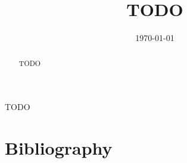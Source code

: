 \documentclass[11pt]{amsart}
\title{TODO}
\date{\today}
\begin{document}
\begin{abstract}
	TODO 
\end{abstract}
\maketitle
TODO

\section[bib]{Bibliography}
\end{document}
